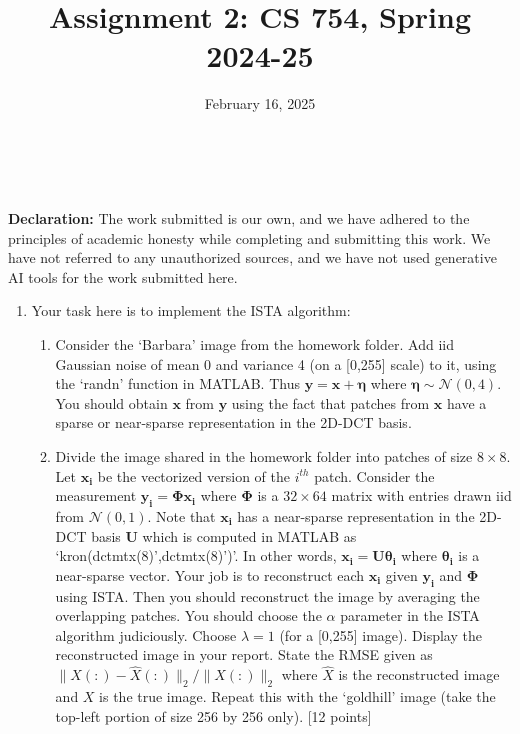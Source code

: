 \documentclass{article}
\title{Assignment 2: CS 754, Spring 2024-25}
\author{
\IEEEauthorblockN{
    \begin{tabular}{cccc}
        \begin{minipage}[t]{0.23\textwidth}
            \centering
            Amitesh Shekhar\\
            IIT Bombay\\
            22b0014@iitb.ac.in
        \end{minipage} & 
        \begin{minipage}[t]{0.23\textwidth}
            \centering
            Anupam Rawat\\
            IIT Bombay\\
            22b3982@iitb.ac.in
        \end{minipage} & 
        \begin{minipage}[t]{0.23\textwidth}
            \centering
            Toshan Achintya Golla\\
            IIT Bombay\\
            22b2234@iitb.ac.in
        \end{minipage} \\
        \\ 
    \end{tabular}
}
}
\date{February 16, 2025}
\begin{document}
\maketitle

\\
\\

\textbf{Declaration:} The work submitted is our own, and
we have adhered to the principles of academic honesty while completing and submitting this work. We have not
referred to any unauthorized sources, and we have not used generative AI tools for the work submitted here.

\begin{enumerate}
\item Your task here is to implement the ISTA algorithm:
\begin{enumerate}
\item Consider the `Barbara' image from the homework folder. Add iid Gaussian noise of mean 0 and variance 4 (on a [0,255] scale) to it, using the `randn' function in MATLAB. Thus $\boldsymbol{y} = \boldsymbol{x} + \boldsymbol{\eta}$ where $\boldsymbol{\eta} \sim \mathcal{N}(0,4)$. You should obtain $\boldsymbol{x}$ from $\boldsymbol{y}$ using the fact that patches from $\boldsymbol{x}$ have a sparse or near-sparse representation in the 2D-DCT basis. 
\item Divide the image shared in the homework folder into patches of size $8 \times 8$. Let $\boldsymbol{x_i}$ be the vectorized version of the $i^{th}$ patch. Consider the measurement $\boldsymbol{y_i} = \boldsymbol{\Phi x_i}$ where $\boldsymbol{\Phi}$ is a $32 \times 64$ matrix with entries drawn iid from $\mathcal{N}(0,1)$. Note that $\boldsymbol{x_i}$ has a near-sparse representation in the 2D-DCT basis $\boldsymbol{U}$ which is computed in MATLAB as `kron(dctmtx(8)',dctmtx(8)')'. In other words, $\boldsymbol{x_i} = \boldsymbol{U \theta_i}$ where $\boldsymbol{\theta_i}$ is a near-sparse vector. Your job is to reconstruct each $\boldsymbol{x_i}$ given $\boldsymbol{y_i}$ and $\boldsymbol{\Phi}$ using ISTA. Then you should reconstruct the image by averaging the overlapping patches. You should choose the $\alpha$ parameter in the ISTA algorithm judiciously. Choose $\lambda = 1$ (for a [0,255] image). Display the reconstructed image in your report. State the RMSE given as $\|X(:)-\hat{X}(:)\|_2/\|X(:)\|_2$ where $\hat{X}$ is the reconstructed image and $X$ is the true image. Repeat this with the `goldhill' image (take the top-left portion of size 256 by 256 only). \textsf{[12 points]}

\end{enumerate}
\end{enumerate}
\end{document}
